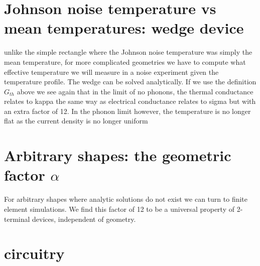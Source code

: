 \section{Johnson noise temperature vs mean temperatures: wedge device}
unlike the simple rectangle where the Johnson noise temperature was simply  the mean temperature, for more complicated geometries we have to compute what  effective temperature we will measure in a noise experiment given the temperature profile. The wedge can be solved analytically.  If we use the definition $G_{th}$ above we see again that in the limit of no phonons, the thermal conductance relates to kappa the same way as electrical conductance relates to sigma but with an extra factor of 12.
In the phonon limit however, the temperature is no longer flat as the current density is no longer uniform

\section{Arbitrary shapes: the geometric factor $\alpha$}
For arbitrary shapes where analytic solutions do not exist we can turn to finite element simulations. We find this factor of 12 to be a universal property of 2-terminal devices, independent of geometry.

\section{circuitry}
